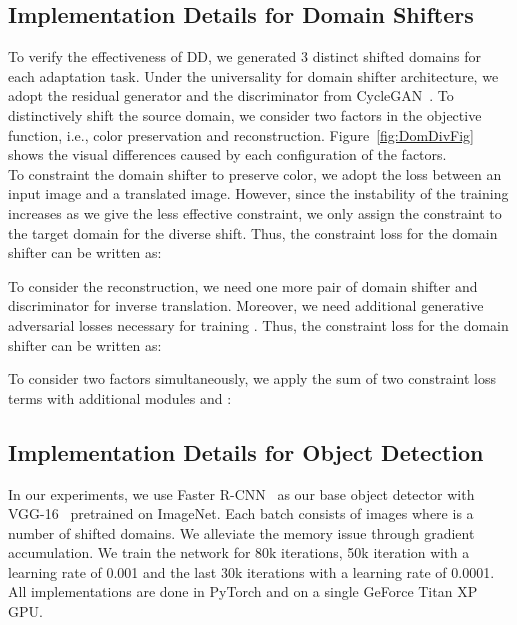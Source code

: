 \documentclass[10pt,twocolumn,letterpaper]{article}
\begin{document}
\subsection{Implementation Details for Domain Shifters}  \label{sec:ImpleDomShifter}
To verify the effectiveness of DD, we generated 3 distinct shifted domains for each adaptation task.
Under the universality for domain shifter architecture, we adopt the residual generator and the discriminator from CycleGAN~\cite{CycleGAN}.
To distinctively shift the source domain, we consider two factors in the objective function, i.e., color preservation and reconstruction.
Figure~\ref{fig:DomDivFig} shows the visual differences caused by each configuration of the factors.\\

To constraint the domain shifter to preserve color, we adopt the  loss between an input image and a translated image.
However, since the instability of the training increases as we give the less effective constraint, we only assign the constraint to the target domain for the diverse shift.
Thus, the constraint loss for the domain shifter can be written as:








 To consider the reconstruction, we need one more pair of domain shifter  and discriminator  for inverse translation.
Moreover, we need additional generative adversarial losses necessary for training .
Thus, the constraint loss for the domain shifter can be written as:




To consider two factors simultaneously, we apply the sum of two constraint loss terms with additional modules  and :



\subsection{Implementation Details for Object Detection}
In our experiments, we use Faster R-CNN~\cite{FasterR-CNN} as our base object detector with VGG-16~\cite{VGG} pretrained on ImageNet.
Each batch consists of  images where  is a number of shifted domains. 
We alleviate the memory issue through gradient accumulation. 
We train the network for 80k iterations, 50k iteration with a learning rate of 0.001 and the last 30k iterations with a learning rate of 0.0001.
All implementations are done in PyTorch and on a single GeForce Titan XP GPU.
\end{document}
